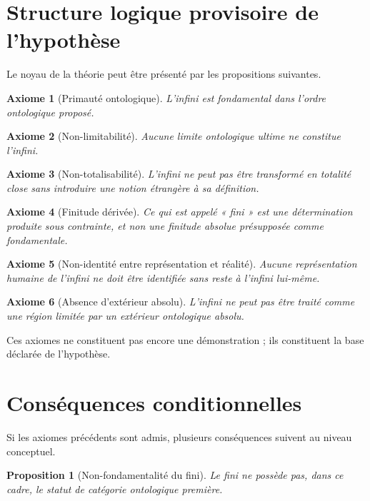 \documentclass[11pt,a4paper]{article}
\newtheorem{axiom}{Axiome}
\newtheorem{proposition}{Proposition}
\begin{document}
\section{Structure logique provisoire de l'hypothèse}

Le noyau de la théorie peut être présenté par les propositions suivantes.

\begin{axiom}[Primauté ontologique]
L'infini est fondamental dans l'ordre ontologique proposé.
\end{axiom}

\begin{axiom}[Non-limitabilité]
Aucune limite ontologique ultime ne constitue l'infini.
\end{axiom}

\begin{axiom}[Non-totalisabilité]
L'infini ne peut pas être transformé en totalité close sans introduire une notion étrangère à sa définition.
\end{axiom}

\begin{axiom}[Finitude dérivée]
Ce qui est appelé « fini » est une détermination produite sous contrainte, et non une finitude absolue présupposée comme fondamentale.
\end{axiom}

\begin{axiom}[Non-identité entre représentation et réalité]
Aucune représentation humaine de l'infini ne doit être identifiée sans reste à l'infini lui-même.
\end{axiom}

\begin{axiom}[Absence d'extérieur absolu]
L'infini ne peut pas être traité comme une région limitée par un extérieur ontologique absolu.
\end{axiom}

Ces axiomes ne constituent pas encore une démonstration ; ils constituent la base déclarée de l'hypothèse.

\section{Conséquences conditionnelles}

Si les axiomes précédents sont admis, plusieurs conséquences suivent au niveau conceptuel.

\begin{proposition}[Non-fondamentalité du fini]
Le fini ne possède pas, dans ce cadre, le statut de catégorie ontologique première.
\end{proposition}
\end{document}
